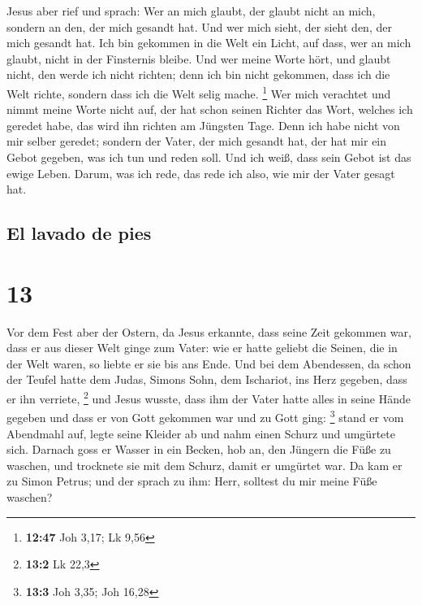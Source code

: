  Jesus aber rief und sprach: Wer an mich glaubt, der
glaubt nicht an mich, sondern an den, der mich gesandt hat.
 Und wer mich sieht, der sieht den, der mich gesandt hat.
 Ich bin gekommen in die Welt ein Licht, auf dass, wer an
mich glaubt, nicht in der Finsternis bleibe.  Und wer
meine Worte hört, und glaubt nicht, den werde ich nicht richten; denn
ich bin nicht gekommen, dass ich die Welt richte, sondern dass ich die
Welt selig mache. \footnote{\textbf{12:47} Joh 3,17; Lk 9,56}
 Wer mich verachtet und nimmt meine Worte nicht auf, der
hat schon seinen Richter das Wort, welches ich geredet habe, das wird
ihn richten am Jüngsten Tage.  Denn ich habe nicht von
mir selber geredet; sondern der Vater, der mich gesandt hat, der hat mir
ein Gebot gegeben, was ich tun und reden soll.  Und ich
weiß, dass sein Gebot ist das ewige Leben. Darum, was ich rede, das rede
ich also, wie mir der Vater gesagt hat.

\hypertarget{el-lavado-de-pies}{%
\subsection{El lavado de pies}\label{el-lavado-de-pies}}

\hypertarget{section-12}{%
\section{13}\label{section-12}}

 Vor dem Fest aber der Ostern, da Jesus erkannte, dass
seine Zeit gekommen war, dass er aus dieser Welt ginge zum Vater: wie er
hatte geliebt die Seinen, die in der Welt waren, so liebte er sie bis
ans Ende.  Und bei dem Abendessen, da schon der Teufel
hatte dem Judas, Simons Sohn, dem Ischariot, ins Herz gegeben, dass er
ihn verriete, \footnote{\textbf{13:2} Lk 22,3}  und Jesus
wusste, dass ihm der Vater hatte alles in seine Hände gegeben und dass
er von Gott gekommen war und zu Gott ging: \footnote{\textbf{13:3} Joh
  3,35; Joh 16,28}  stand er vom Abendmahl auf, legte
seine Kleider ab und nahm einen Schurz und umgürtete sich.
 Darnach goss er Wasser in ein Becken, hob an, den Jüngern
die Füße zu waschen, und trocknete sie mit dem Schurz, damit er umgürtet
war.  Da kam er zu Simon Petrus; und der sprach zu ihm:
Herr, solltest du mir meine Füße waschen?

